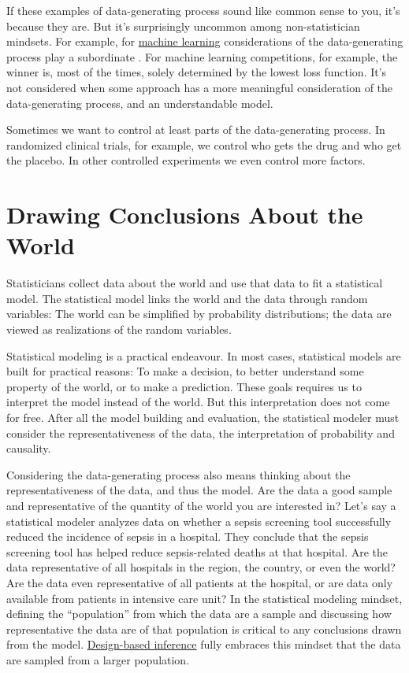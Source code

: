 \documentclass[
  10pt,
]{scrbook}
\begin{document}
If these examples of data-generating process sound like common sense to you, it's because they are.
But it's surprisingly uncommon among non-statistician mindsets.
For example, for \protect\hyperlink{machine-learning}{machine learning} considerations of the data-generating process play a subordinate .
For machine learning competitions, for example, the winner is, most of the times, solely determined by the lowest loss function.
It's not considered when some approach has a more meaningful consideration of the data-generating process, and an understandable model.

Sometimes we want to control at least parts of the data-generating process.
In randomized clinical trials, for example, we control who gets the drug and who get the placebo.
In other controlled experiments we even control more factors.

\hypertarget{drawing-conclusions-about-the-world}{%
\section{Drawing Conclusions About the World}\label{drawing-conclusions-about-the-world}}

Statisticians collect data about the world and use that data to fit a statistical model.
The statistical model links the world and the data through random variables:
The world can be simplified by probability distributions;
the data are viewed as realizations of the random variables.

Statistical modeling is a practical endeavour.
In most cases, statistical models are built for practical reasons:
To make a decision, to better understand some property of the world, or to make a prediction.
These goals requires us to interpret the model instead of the world.
But this interpretation does not come for free.
After all the model building and evaluation, the statistical modeler must consider the representativeness of the data, the interpretation of probability and causality.

Considering the data-generating process also means thinking about the representativeness of the data, and thus the model.
Are the data a good sample and representative of the quantity of the world you are interested in?
Let's say a statistical modeler analyzes data on whether a sepsis screening tool successfully reduced the incidence of sepsis in a hospital.
They conclude that the sepsis screening tool has helped reduce sepsis-related deaths at that hospital.
Are the data representative of all hospitals in the region, the country, or even the world?
Are the data even representative of all patients at the hospital, or are data only available from patients in intensive care unit?
In the statistical modeling mindset, defining the ``population'' from which the data are a sample and discussing how representative the data are of that population is critical to any conclusions drawn from the model.
\protect\hyperlink{design-based}{Design-based inference} fully embraces this mindset that the data are sampled from a larger population.
\end{document}
